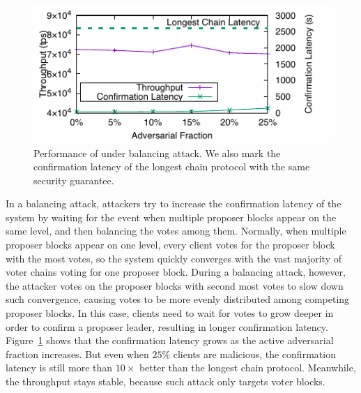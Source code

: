 \label{sec:balancing}

\begin{figure}
    \centering
    \includegraphics{figures/attack-fig-balancing.pdf}
    \caption{\small Performance of \prism under balancing attack. We also mark the confirmation latency of the longest chain protocol with the same security guarantee.}
    \label{fig:attack-balancing}
\end{figure}

In a balancing attack, attackers try to increase the confirmation latency of the system by waiting for the event when multiple proposer blocks appear on the same level, and then balancing the votes among them. Normally, when multiple proposer blocks appear on one level, every client votes for the proposer block with the most votes, so the system quickly converges with the vast majority of voter chains voting for one proposer block. During a balancing attack, however, the attacker votes on the proposer blocks with second most votes to slow down such convergence, causing votes to be more evenly distributed among competing proposer blocks. In this case, clients need to wait for votes to grow deeper in order to confirm a proposer leader, resulting in longer confirmation latency. Figure~\ref{fig:attack-balancing} shows that the confirmation latency grows as the active adversarial fraction increases. But even when $25\%$ clients are malicious, the confirmation latency is still more than $10\times$ better than the longest chain protocol. Meanwhile, the throughput stays stable, because such attack only targets voter blocks.

